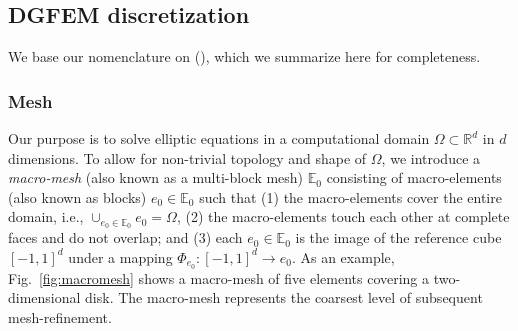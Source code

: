 \subsection{DGFEM discretization}
\label{sec:DGFEM}

We base our nomenclature on (\cite{arnold.d;brezzi.f;cockburn.b;marini.l2002,sherwin20062d,di2011mathematical,fick2014interior,kozdon2018energy,kozdon2019robust}), which we summarize here for completeness.

\subsubsection{Mesh}
\label{sec:mesh}



Our purpose is to solve elliptic equations in a computational domain
$\Omega \subset \mathbb{R}^d$ in $d$ dimensions.  To allow for
non-trivial topology and shape of $\Omega$, we introduce a
\emph{macro-mesh} (also known as a multi-block mesh) $\mathbb{E}_0$ consisting of macro-elements (also known as blocks) $e_0 \in
\mathbb{E}_0$ such that (1) the macro-elements cover the entire
domain, i.e., $\cup_{e_0\in \mathbb{E}_0}e_0=\Omega$, (2) the
macro-elements touch each other at complete faces and do not overlap;
and (3) each $e_0 \in \mathbb{E}_0$ is the image of the reference cube
$[-1,1]^{d}$ under a mapping
  $\Phi_{e_0}:[-1,1]^d\rightarrow e_0$.  As an example,
Fig.~\ref{fig:macromesh} shows a macro-mesh of five elements covering a
two-dimensional disk.  The macro-mesh represents the coarsest level of
subsequent mesh-refinement.

